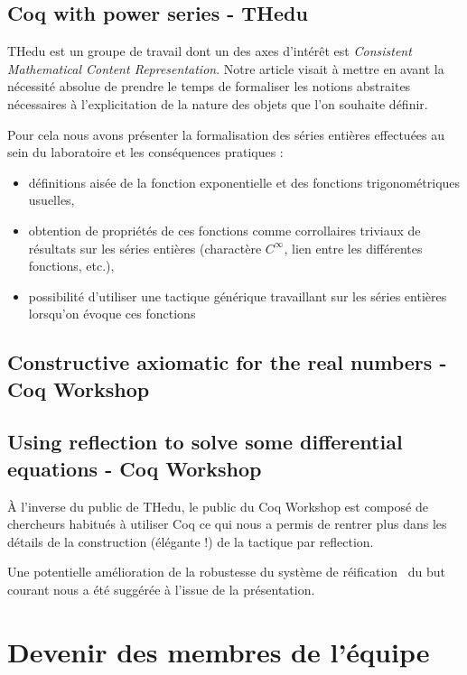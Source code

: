\documentclass[11pt]{article}
\begin{document}
\subsection{Coq with power series - THedu}

THedu est un groupe de travail dont un des axes d'intérêt est \textit{Consistent
Mathematical Content Representation}. Notre article visait à mettre en avant la
nécessité absolue de prendre le temps de formaliser les notions abstraites nécessaires
à l'explicitation de la nature des objets que l'on souhaite définir.

Pour cela nous avons présenter la formalisation des séries entières effectuées au
sein du laboratoire et les conséquences pratiques :
\begin{itemize}
 \item définitions aisée de la fonction exponentielle et des fonctions
 trigonométriques usuelles,
 \item obtention de propriétés de ces fonctions comme corrollaires triviaux
 de résultats sur les séries entières (charactère $C^{\infty}$, lien entre les
 différentes fonctions, etc.),
 \item possibilité d'utiliser une tactique générique travaillant sur les séries
 entières lorsqu'on évoque ces fonctions
\end{itemize}

\subsection{Constructive axiomatic for the real numbers - Coq Workshop}

\subsection{Using reflection to solve some differential equations - Coq Workshop}

À l'inverse du public de THedu, le public du Coq Workshop est composé de chercheurs
habitués à utiliser Coq ce qui nous a permis de rentrer plus dans les détails de la
construction (élégante !) de la tactique par reflection.

Une potentielle amélioration de la robustesse du système de réification~\cite{adhoc}
du but courant nous a été suggérée à l'issue de la présentation.

\section{Devenir des membres de l'équipe}





\end{document}
